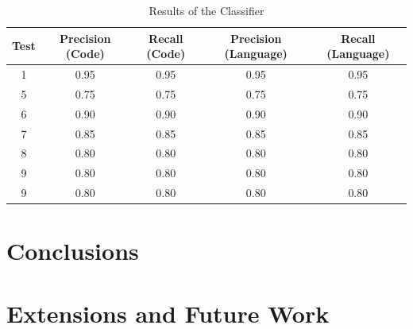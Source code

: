 \documentclass[12pt]{scrreprt}
\begin{document}
\begin{table}[h]
        \centering
        \begin{tabular}{|c|c|c|c|c|}
            \hline
            \textbf{Test} & \textbf{Precision (Code)} & \textbf{Recall (Code)} & \textbf{Precision (Language)} & \textbf{Recall (Language)} \\
            \hline
            1 & 0.95 & 0.95 & 0.95 & 0.95 \\
            \hline
            5 & 0.75 & 0.75 & 0.75 & 0.75 \\
            6 & 0.90 & 0.90 & 0.90 & 0.90 \\
            \hline
            7 & 0.85 & 0.85 & 0.85 & 0.85 \\
            \hline
            8 & 0.80 & 0.80 & 0.80 & 0.80 \\
            \hline
            9 & 0.80 & 0.80 & 0.80 & 0.80 \\
            \hline
            9 & 0.80 & 0.80 & 0.80 & 0.80 \\
            \hline
        \end{tabular}
        \caption{Results of the Classifier}
        \label{tab:results}
\end{table}








\chapter{Conclusions}



\chapter{Extensions and Future Work}
\end{document}
